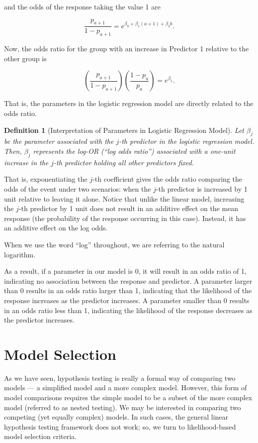 \documentclass[
]{book}
\theoremstyle{plain}
\theoremstyle{mydefn}
\newtheorem{definition}{Definition}[chapter]
\theoremstyle{myexmpl}
\theoremstyle{remark}
\begin{document}
and the odds of the response taking the value 1 are

\[\frac{p_{a+1}}{1 - p_{a+1}} = e^{\beta_0 + \beta_1 (a + 1) + \beta_2 b}.\]

Now, the odds ratio for the group with an increase in Predictor 1 relative to the other group is

\[\left(\frac{p_{a+1}}{1 - p_{a+1}}\right) \left(\frac{1 - p_a}{p_a}\right) = e^{\beta_1}.\]

That is, the parameters in the logistic regression model are directly related to the odds ratio.

\begin{definition}[Interpretation of Parameters in Logistic Regression Model]
Let \(\beta_j\) be the parameter associated with the \(j\)-th predictor in the logistic regression model. Then, \(\beta_j\) represents the log-OR (``log odds ratio'') associated with a one-unit increase in the \(j\)-th predictor holding all other predictors fixed.
\end{definition}

That is, exponentiating the \(j\)-th coefficient gives the odds ratio comparing the odds of the event under two scenarios: when the \(j\)-th predictor is increased by 1 unit relative to leaving it alone. Notice that unlike the linear model, increasing the \(j\)-th predictor by 1 unit does not result in an additive effect on the mean response (the probability of the response occurring in this case). Instead, it has an additive effect on the log odds.

\begin{rmdtip}
When we use the word ``log'' throughout, we are referring to the natural logarithm.
\end{rmdtip}

As a result, if a parameter in our model is 0, it will result in an odds ratio of 1, indicating no association between the response and predictor. A parameter larger than 0 results in an odds ratio larger than 1, indicating that the likelihood of the response increases as the predictor increases. A parameter smaller than 0 results in an odds ratio less than 1, indicating the likelihood of the response decreases as the predictor increases.

\hypertarget{nlm-selection}{%
\chapter{Model Selection}\label{nlm-selection}}

As we have seen, hypothesis testing is really a formal way of comparing two models --- a simplified model and a more complex model. However, this form of model comparisons requires the simple model to be a subset of the more complex model (referred to as nested testing). We may be interested in comparing two competing (yet equally complex) models. In such cases, the general linear hypothesis testing framework does not work; so, we turn to likelihood-based model selection criteria.
\end{document}
